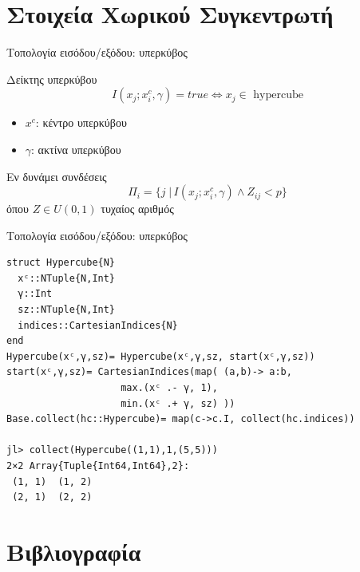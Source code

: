 \documentclass[10pt,lualatex]{beamer}
\begin{document}
\section{Στοιχεία Χωρικού Συγκεντρωτή}
\begin{frame}[fragile]{Τοπολογία εισόδου/εξόδου: υπερκύβος}
  \begin{block}{Δείκτης υπερκύβου}
    \[ I(x_j; x_i^c, γ) = \mathit{true} \iff x_j \in \text{ hypercube} \]
    \begin{itemize}
      \item[] $x^c$: κέντρο υπερκύβου
      \item[] $γ$: ακτίνα υπερκύβου
    \end{itemize}
  \end{block}
  \begin{block}{Εν δυνάμει συνδέσεις}
    \[ Π_i= \{j \;|\, I(x_j; x_i^c, γ) \wedge Z_{ij} < p\} \]
    όπου $Ζ \in U(0,1)$ τυχαίος αριθμός
  \end{block}
\end{frame}

\begin{frame}[fragile]{Τοπολογία εισόδου/εξόδου: υπερκύβος}
\begin{verbatim}
struct Hypercube{N}
  xᶜ::NTuple{N,Int}
  γ::Int
  sz::NTuple{N,Int}
  indices::CartesianIndices{N}
end
Hypercube(xᶜ,γ,sz)= Hypercube(xᶜ,γ,sz, start(xᶜ,γ,sz))
start(xᶜ,γ,sz)= CartesianIndices(map( (a,b)-> a:b,
                    max.(xᶜ .- γ, 1),
                    min.(xᶜ .+ γ, sz) ))
Base.collect(hc::Hypercube)= map(c->c.I, collect(hc.indices))

jl> collect(Hypercube((1,1),1,(5,5)))
2×2 Array{Tuple{Int64,Int64},2}:
 (1, 1)  (1, 2)
 (2, 1)  (2, 2)
\end{verbatim}
\end{frame}


\section{Βιβλιογραφία}
\begin{frame}
  \printbibliography
\end{frame}
\end{document}
